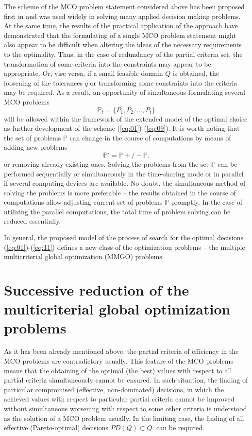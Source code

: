 \documentclass{svproc}
\begin{document}
The scheme of the MCO problem statement considered above has been proposed first in \cite{x11} and was used widely in solving many applied decision making problems. At the same time, the results of the practical application of the approach have demonstrated that the formulating of a single MCO problem statement might also appear to be difficult when altering the ideas of the necessary requirements to the optimality. Thus, in the case of redundancy of the partial criteria set, the transformation of some criteria into the constraints may appear to be appropriate. Or, vise versa, if a small feasible domain $Q$ is obtained, the loosening of the tolerances $q$ or transforming some constraints into the criteria may be required. As a result, an opportunity of simultaneous formulating several MCO problems 
\begin{equation}
\label{eq:10}
\mathbb{P}_t=\{P_1,P_2,\dots,P_t\}
\end{equation}
will be allowed  within the framework of the extended model of the optimal choice as further development of the scheme (\ref{eq:01})-(\ref{eq:09}). It is worth noting that the set of problems $\mathbb{P}$ can change in the course of computations by means of adding new problems 
\begin{equation}
\label{eq:11}
\mathbb{P}'=\mathbb{P}+/-\mathbb{P}.
\end{equation}
or removing already existing ones. Solving the problems from the set $\mathbb{P}$ can be performed sequentially or simultaneously in the time-sharing mode or in parallel if several computing devices are available. No doubt, the simultaneous method of solving the problems is more preferable -- the results obtained in the course of computations allow adjusting current set of problems $\mathbb{P}$ promptly. In the case of utilizing the parallel computations, the total time of problem solving can be reduced essentially.

In general, the proposed model of the process of search for the optimal decisions (\ref{eq:01})-(\ref{eq:11}) defines a new class of the optimization problems -- the multiple multicriterial global optimization (MMGO) problems.

\section{Successive reduction of the multicriterial global optimization problems }
\label{sec:03}

As it has been already mentioned above, the partial criteria of efficiency in the MCO problems are contradictory usually. This feature of the MCO problems means that the obtaining of the optimal (the best) values with respect to all partial criteria simultaneously cannot be ensured. In such situation, the finding of particular compromised (effective, non-dominated) decisions, in which the achieved values with respect to particular partial criteria cannot be improved without simultaneous worsening with respect to some other criteria is understood as the solution of a MCO problem usually. In the limiting case, the finding of all effective (Pareto-optimal) decisions $PD(Q) \subset Q$. can be required.
\end{document}
